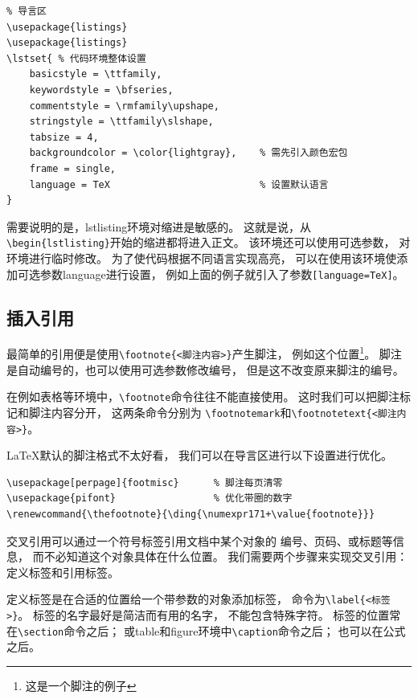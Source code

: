 \documentclass{ctexart}
\numberwithin{equation}{section}			%
\renewcommand{\thefootnote}{\ding{\numexpr171+\value{footnote}}}
\begin{document}
\begin{lstlisting}
% 导言区
\usepackage{listings}
\usepackage{listings}
\lstset{ % 代码环境整体设置
	basicstyle = \ttfamily,
	keywordstyle = \bfseries,
	commentstyle = \rmfamily\upshape,
	stringstyle = \ttfamily\slshape,
	tabsize = 4,
	backgroundcolor = \color{lightgray},	% 需先引入颜色宏包
	frame = single,
	language = TeX							% 设置默认语言
}
\end{lstlisting}
	
	需要说明的是，lstlisting环境对缩进是敏感的。
	这就是说，从\verb|\begin{lstlisting}|开始的缩进都将进入正文。
	该环境还可以使用可选参数，
	对环境进行临时修改。
	为了使代码根据不同语言实现高亮，
	可以在使用该环境使添加可选参数language进行设置，
	例如上面的例子就引入了参数\verb|[language=TeX]|。
	
	\subsection{插入引用}
	最简单的引用便是使用\verb|\footnote{<脚注内容>}|产生脚注，
	例如这个位置\footnote{这是一个脚注的例子}。
	脚注是自动编号的，也可以使用可选参数修改编号，
	但是这不改变原来脚注的编号。
	
	在例如表格等环境中，\verb|\footnote|命令往往不能直接使用。
	这时我们可以把脚注标记和脚注内容分开\footnotemark，
	这两条命令分别为
	\verb|\footnotemark|和\verb|\footnotetext{<脚注内容>}|。
	
	\LaTeX 默认的脚注格式不太好看，
	我们可以在导言区进行以下设置进行优化。
	
\begin{lstlisting}
\usepackage[perpage]{footmisc}		% 脚注每页清零
\usepackage{pifont}					% 优化带圈的数字
\renewcommand{\thefootnote}{\ding{\numexpr171+\value{footnote}}}
\end{lstlisting}
	
	交叉引用可以通过一个符号标签引用文档中某个对象的
	编号、页码、或标题等信息，
	而不必知道这个对象具体在什么位置。
	我们需要两个步骤来实现交叉引用：
	定义标签和引用标签。
	
	定义标签是在合适的位置给一个带参数的对象添加标签，
	命令为\verb|\label{<标签>}|。
	标签的名字最好是简洁而有用的名字，
	不能包含特殊字符。
	标签的位置常在\verb|\section|命令之后；
	或table和figure环境中\verb|\caption|命令之后；
	也可以在公式之后。
	
\end{document}
